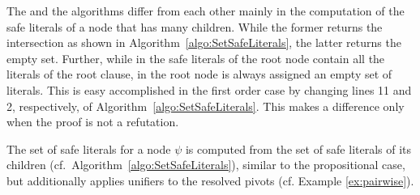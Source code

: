 
The {\RPI} and the {\RP} algorithms differ from each other mainly in the
computation of the safe literals of a node that has many children. While the former 
returns the intersection as shown in Algorithm~\ref{algo:SetSafeLiterals}, the latter
returns the empty set. 
Further, while in {\RPI} the safe literals of the root node contain all the literals of the root clause, in {\RP} the root node is always assigned an empty set of literals. 
This is easy accomplished in the first order case by changing lines 11 and 2, respectively, of Algorithm~\ref{algo:SetSafeLiterals}.
This makes a difference only when the proof is not a refutation.

The set of safe literals for a node $\psi$ is computed from the set of safe literals of its children (cf.\ Algorithm~\ref{algo:SetSafeLiterals}), similar to the propositional case, but additionally applies unifiers to the resolved pivots (cf. Example \ref{ex:pairwise}).






